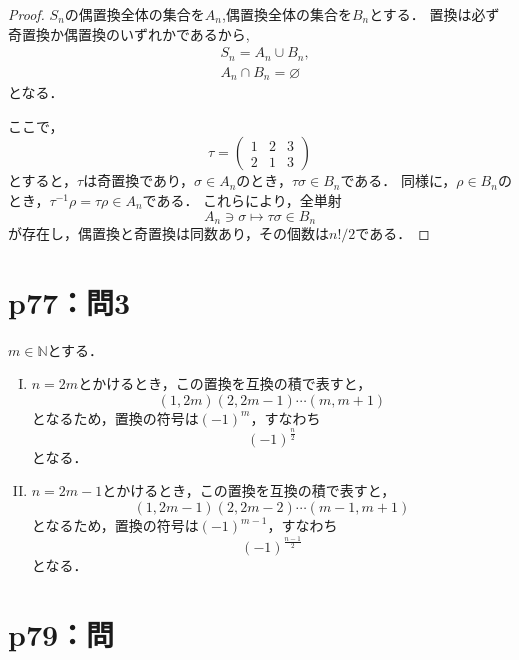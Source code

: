 \documentclass[a4paper,10pt,fleqn]{ltjsarticle}
\begin{document}
\begin{tleftbar}
  \begin{proof}
    $S_n$の偶置換全体の集合を$A_n$,偶置換全体の集合を$B_n$とする．
    置換は必ず奇置換か偶置換のいずれかであるから,
    \begin{align*}
       & S_n = A_n \cup B_n ,       \\
       & A_n \cap B_n = \varnothing
    \end{align*}
    となる．

    ここで，
    \[
      \tau = \begin{pmatrix} 1 & 2 & 3 \\ 2 & 1 & 3 \end{pmatrix}
    \]
    とすると，$\tau$は奇置換であり，$\sigma \in  A_n$のとき，$ \tau \sigma \in B_n$である．
    同様に，$ \rho  \in B_n$のとき，$\tau^{-1} \rho = \tau \rho \in A_n$である．
    これらにより，全単射
    \[
      A_n \ni \sigma \mapsto \tau \sigma \in B_n
    \]
    が存在し，偶置換と奇置換は同数あり，その個数は$n! /2$である．
  \end{proof}
\end{tleftbar}


\section*{p77：問3}

\begin{leftbar}
  $m \in \mathbb{N}$とする．
  \begin{enumerate}[(I)]
    \item $n=2m$とかけるとき，この置換を互換の積で表すと，
          \[
            (1,2m)(2,2m-1) \dotsm (m,m+1)
          \]
          となるため，置換の符号は$(-1)^m$，すなわち
          \[
            (-1)^{\frac{n}{2}}
          \]
          となる．
    \item $n=2m-1$とかけるとき，この置換を互換の積で表すと，
          \[
            (1,2m-1)(2,2m-2) \dotsm (m-1,m+1)
          \]
          となるため，置換の符号は$(-1)^{m-1}$，すなわち
          \[
            (-1)^{\frac{n-1}{2}}
          \]
          となる．
  \end{enumerate}
\end{leftbar}

\newpage


\section*{p79：問}
\end{document}
